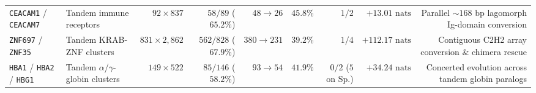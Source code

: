 \documentclass[11pt,a4paper]{article}
\begin{document}
\begin{table}[t!]
{\begin{tabular}{@{}llrrrrrrr@{}}
\addlinespace
\texttt{CEACAM1} / \texttt{CEACAM7} & Tandem immune receptors & $92 \times 837$ & $58 / 89$ ($65.2\%$) & $48 \to 26$ & $45.8\%$ & $1 / 2$ & $+13.01\text{ nats}$ & Parallel $\sim 168\text{ bp}$ lagomorph Ig-domain conversion \\
\texttt{ZNF697} / \texttt{ZNF35} & Tandem KRAB-ZNF clusters & $831 \times 2,862$ & $562 / 828$ ($67.9\%$) & $380 \to 231$ & $39.2\%$ & $1 / 4$ & $+112.17\text{ nats}$ & Contiguous C2H2 array conversion \& chimera rescue \\
\texttt{HBA1} / \texttt{HBA2} / \texttt{HBG1} & Tandem $\alpha$/$\gamma$-globin clusters & $149 \times 522$ & $85 / 146$ ($58.2\%$) & $93 \to 54$ & $41.9\%$ & $0 / 2$ ($5$ on Sp.) & $+34.24\text{ nats}$ & Concerted evolution across tandem globin paralogs \\
\bottomrule
\end{tabular}%
}
\end{table}
\end{document}
